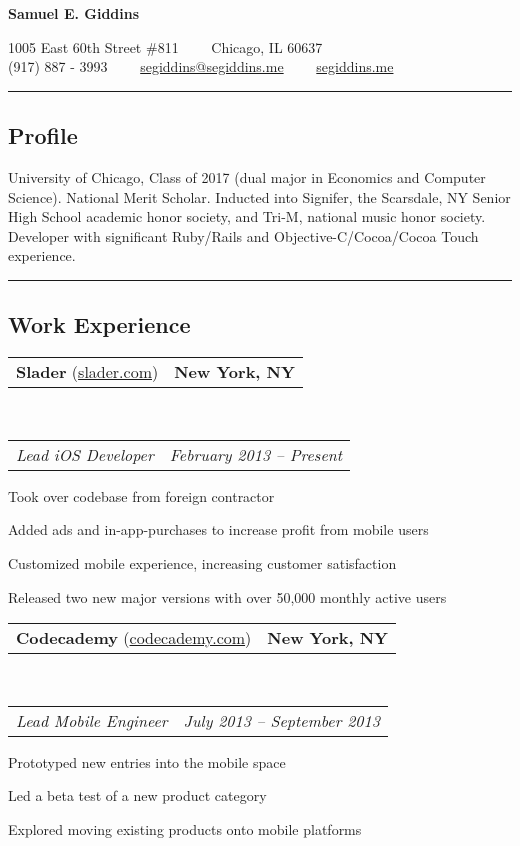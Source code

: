 \documentclass[10pt,letterpaper]{article}
\makeatletter
\newcommand{\headerrow}[2]
{\noindent \begin{tabular*}{\linewidth}{l@{\extracolsep{\fill}}r}
	#1 &
	#2 \\
\end{tabular*}}
\newcommand{\ahref}[1]
{\href{http://#1}{#1}}
\makeatother
\begin{document}
\begin{center}
{\LARGE \textbf{Samuel E. Giddins}}

1005 East 60th Street \#811\ \ \textbullet
\ \ Chicago, IL 60637
\\
(917) 887 - 3993\ \ \textbullet
\ \ \href{mailto:segiddins@segiddins.me}{segiddins@segiddins.me}\ \ \textbullet
\ \ \ahref{segiddins.me}
\end{center}

\hrule
\vspace{-0.4em}
\subsection*{Profile}
University of Chicago, Class of 2017 (dual major in Economics and Computer Science).
National Merit Scholar.
Inducted into Signifer, the Scarsdale, NY Senior High School academic honor society, and Tri-M, national music honor society.
Developer with significant Ruby/Rails and Objective-C/Cocoa/Cocoa Touch experience.

\vspace{0.8em}
\hrule
\vspace{-0.4em}
\subsection*{Work Experience}


	\headerrow
		{\textbf{Slader} (\ahref{slader.com})}
		{\textbf{New York, NY}}
	\\
	\headerrow
		{\emph{Lead iOS Developer}}
		{\emph{February 2013 -- Present}}
	\begin{itemize*}
		\item Took over codebase from foreign contractor
		\item Added ads and in-app-purchases to increase profit from mobile users
		\item Customized mobile experience, increasing customer satisfaction
		\item Released two new major versions with over 50,000 monthly active users
	\end{itemize*}

	\headerrow
		{\textbf{Codecademy} (\ahref{codecademy.com})}
		{\textbf{New York, NY}}
	\\
	\headerrow
		{\emph{Lead Mobile Engineer}}
		{\emph{July 2013 -- September 2013}}
	\begin{itemize*}
		\item Prototyped new entries into the mobile space
		\item Led a beta test of a new product category
		\item Explored moving existing products onto mobile platforms
	\end{itemize*}
\end{document}

